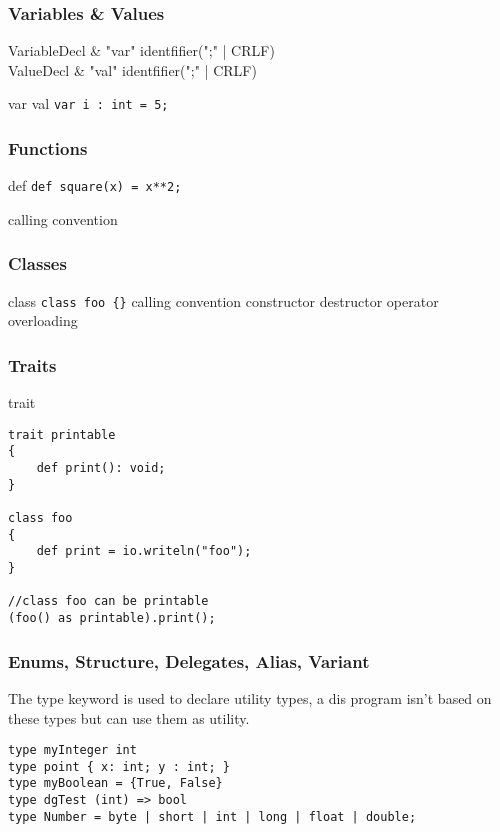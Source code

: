 \documentclass[a4paper]{article}
\begin{document}
\subsubsection*{Variables \& Values}
\begin{ebnf}
	VariableDecl & \rightarrow "var"\; identfifier\; [":" identifier] ["=" Literal] (";" | CRLF) \\
	ValueDecl & \rightarrow "val"\; identfifier\; [":" identifier] ["=" Literal] (";" | CRLF)
\end{ebnf}



var val
\lstinline!var i : int = 5;!

\subsubsection*{Functions}
def
\lstinline!def square(x) = x**2;!

calling convention

\subsubsection*{Classes}
class
\lstinline!class foo {}!
calling convention
constructor
destructor
operator overloading

\subsubsection*{Traits}
trait
\begin{lstlisting}
trait printable
{
	def print(): void;
}

class foo
{
	def print = io.writeln("foo");
}

//class foo can be printable
(foo() as printable).print();
\end{lstlisting}

\subsubsection*{Enums, Structure, Delegates, Alias, Variant}
The type keyword is used to declare utility types, a dis program isn't based on these types but can use them as utility.

\begin{lstlisting}
type myInteger int
type point { x: int; y : int; }
type myBoolean = {True, False}
type dgTest (int) => bool
type Number = byte | short | int | long | float | double;
\end{lstlisting}
\end{document}

